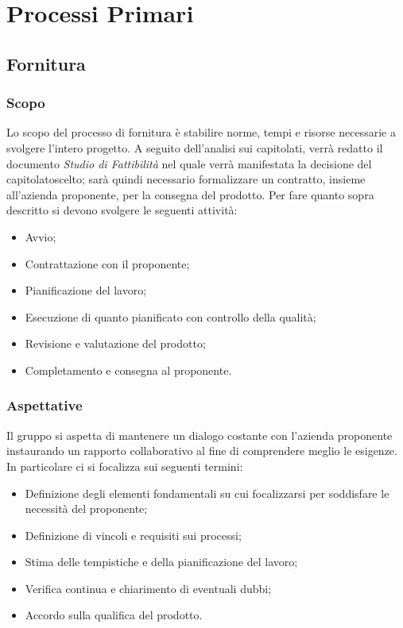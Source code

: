 \section{Processi Primari}

\subsection{Fornitura}
\subsubsection{Scopo}
Lo scopo del processo di fornitura è stabilire norme, tempi e risorse necessarie a svolgere l'intero progetto.
A seguito dell'analisi sui capitolati, verrà redatto il documento \textit{Studio di Fattibilità} nel quale verrà manifestata la decisione del capitolato\glosp scelto; sarà quindi necessario formalizzare un contratto, insieme all'azienda proponente, per la consegna del prodotto. 
Per fare quanto sopra descritto si devono svolgere le seguenti attività:
\begin{itemize}
	\item Avvio;
	\item Contrattazione con il proponente;
	\item Pianificazione del lavoro;
	\item Esecuzione di quanto pianificato con controllo della qualità;
	\item Revisione e valutazione del prodotto;
	\item Completamento e consegna al proponente.
\end{itemize}
\subsubsection{Aspettative}
Il gruppo si aspetta di mantenere un dialogo costante con l'azienda proponente instaurando un rapporto collaborativo al fine di comprendere meglio le esigenze. In particolare ci si focalizza sui seguenti termini:
\begin{itemize}
	\item Definizione degli elementi fondamentali su cui focalizzarsi per soddisfare le necessità del proponente;
	\item Definizione di vincoli e requisiti sui processi;
	\item Stima delle tempistiche e della pianificazione del lavoro;
	\item Verifica continua e chiarimento di eventuali dubbi;
	\item Accordo sulla qualifica del prodotto.
\end{itemize} 
